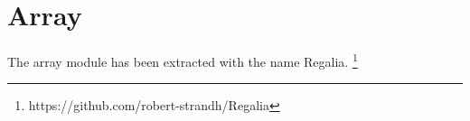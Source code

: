 \chapter{Array}
\label{chap-array}

The array module has been extracted with the name Regalia.%
\footnote{https://github.com/robert-strandh/Regalia}
